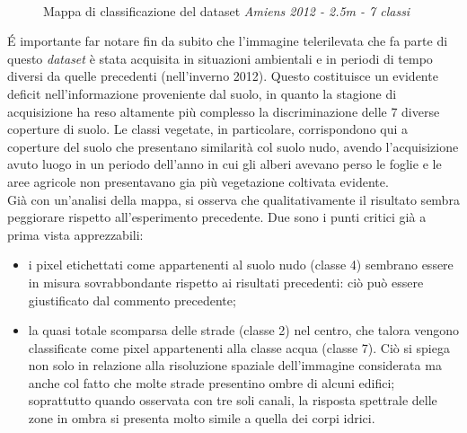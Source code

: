 \begin{figure}[!ht]

\center

\\

\caption{Mappa di classificazione del dataset \emph{Amiens 2012 - 2.5m
- 7 classi}}

\label{fig:ClassMap_Amiens2012_2_5m_noroads}

\end{figure}
\clearpage
\'E importante far notare fin da subito che l'immagine telerilevata
che fa parte di questo \emph{dataset} è stata acquisita in situazioni
ambientali e in periodi di tempo diversi da quelle precedenti
(nell'inverno 2012). Questo costituisce un evidente deficit
nell'informazione proveniente dal suolo, in quanto la stagione di
acquisizione ha reso altamente più complesso la discriminazione delle
7 diverse coperture di suolo. Le classi vegetate, in particolare,
corrispondono qui a coperture del suolo che presentano similarità col
suolo nudo, avendo l'acquisizione avuto luogo in un periodo dell'anno
in cui gli alberi avevano perso le foglie e le aree agricole non
presentavano gia più vegetazione coltivata evidente.\\

Già con un'analisi della mappa, si osserva che qualitativamente il
risultato sembra peggiorare rispetto all'esperimento precedente. Due
sono i punti critici già a prima vista apprezzabili:

\begin{itemize}

\item i pixel etichettati come appartenenti al suolo nudo (classe 4)
sembrano essere in misura sovrabbondante rispetto ai risultati precedenti: ciò
può essere giustificato dal commento precedente;

\item la quasi totale scomparsa delle strade (classe 2) nel centro,
che talora vengono classificate come pixel appartenenti alla classe
acqua (classe 7). Ciò si spiega non solo in relazione alla risoluzione
spaziale dell'immagine considerata ma anche col fatto che molte strade
presentino ombre di alcuni edifici; soprattutto quando osservata con
tre soli canali, la risposta spettrale delle zone in ombra si presenta
molto simile a quella dei corpi idrici.

\end{itemize}

